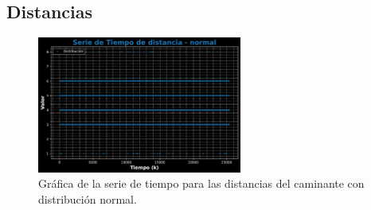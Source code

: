 \documentclass[11pt]{article} %
\begin{document}
	 \subsection{Distancias}
	 \begin{figure}[h]
	 	\centering
	 	\includegraphics[width=0.6\textwidth]{graf_distancia_normal.pdf}
	 	\caption{Gráfica de la serie de tiempo para las distancias del caminante con distribución normal.}
	 	\label{fig:distNormalGraf}
	 \end{figure}
\end{document}
